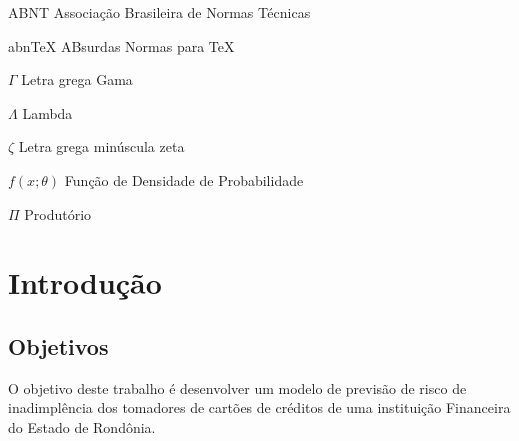 \documentclass[
	12pt,				%
	openright,			%
	oneside,      %
	a4paper,			%
	english,			%
	french,				%
	spanish,			%
	brazil,				%
	]{abntex2}\usepackage[]{graphicx}\usepackage[]{xcolor}
\begin{document}
\listoffigures*
\cleardoublepage

\listoftables*
\cleardoublepage

\begin{siglas}
  \item[ABNT] Associação Brasileira de Normas Técnicas
  \item[abnTeX] ABsurdas Normas para TeX
\end{siglas}

\begin{simbolos}
  \item[$ \Gamma $] Letra grega Gama
  \item[$ \Lambda $] Lambda
  \item[$ \zeta $] Letra grega minúscula zeta
  \item[$ f(x;\theta)$] Função de Densidade de Probabilidade
  \item[$ \Pi $] Produtório
\end{simbolos}

\tableofcontents*
\cleardoublepage

\textual

\chapter[Introdução]{Introdução}



  \section{Objetivos}

O objetivo deste trabalho é desenvolver um modelo de previsão de risco de inadimplência 
dos tomadores de cartões de créditos de uma instituição Financeira do Estado de Rondônia.

  \section{}
\end{document}
